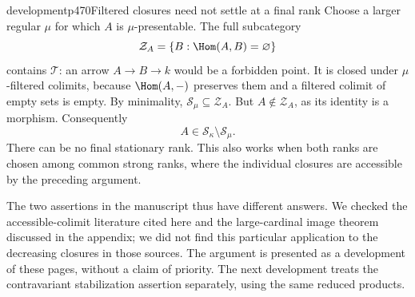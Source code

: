 \begin{dcomment}{development}{p470}{Filtered closures need not settle at a final rank}
Choose a larger regular $\mu$ for which $A$ is $\mu$-presentable. The full subcategory
\[
 \mathcal Z_A=\{B:\Hom(A,B)=\varnothing\}
\]
contains $\mathcal T$: an arrow $A\to B\to k$ would be a forbidden point. It is closed under $\mu$-filtered colimits, because $\Hom(A,-)$ preserves them and a filtered colimit of empty sets is empty. By minimality, $\mathcal S_\mu\subseteq\mathcal Z_A$. But $A\notin\mathcal Z_A$, as its identity is a morphism. Consequently
\[
 A\in\mathcal S_\kappa\setminus\mathcal S_\mu.
\]
There can be no final stationary rank. This also works when both ranks are chosen among common strong ranks, where the individual closures are accessible by the preceding argument.

The two assertions in the manuscript thus have different answers. We checked the accessible-colimit literature cited here and the large-cardinal image theorem discussed in the appendix; we did not find this particular application to the decreasing closures in those sources. The argument is presented as a development of these pages, without a claim of priority. The next development treats the contravariant stabilization assertion separately, using the same reduced products.
\end{dcomment}

